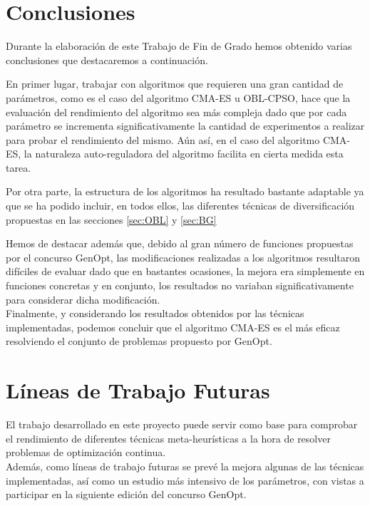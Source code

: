
\section{Conclusiones}

Durante la elaboración de este Trabajo de Fin de Grado hemos obtenido varias conclusiones que destacaremos a continuación.

En primer lugar, trabajar con algoritmos que requieren una gran cantidad de parámetros, como es el caso del algoritmo CMA-ES u OBL-CPSO, hace que la evaluación del rendimiento del algoritmo sea más compleja dado que por cada parámetro se incrementa significativamente la cantidad de experimentos a realizar para probar el rendimiento del mismo. Aún así, en el caso del algoritmo CMA-ES, la naturaleza auto-reguladora del algoritmo facilita en cierta medida esta tarea. 

Por otra parte, la estructura de los algoritmos ha resultado bastante adaptable ya que se ha podido incluir, en todos ellos, las diferentes técnicas de diversificación propuestas en las secciones \ref{sec:OBL} y \ref{sec:BG}

Hemos de destacar además que, debido al gran número de funciones propuestas por el concurso GenOpt, las modificaciones realizadas a los algoritmos resultaron difíciles de evaluar dado que en bastantes ocasiones, la mejora era simplemente en funciones concretas y en conjunto, los resultados no variaban significativamente para considerar dicha modificación.\\

Finalmente, y considerando los resultados obtenidos por las técnicas implementadas, podemos concluir que el algoritmo CMA-ES es el más eficaz resolviendo el conjunto de problemas propuesto por GenOpt.


\section{Líneas de Trabajo Futuras}

El trabajo desarrollado en este proyecto puede servir como base para comprobar el rendimiento de diferentes técnicas meta-heurísticas a la hora de resolver problemas de optimización continua. \\
Además, como líneas de trabajo futuras se prevé la mejora algunas de las técnicas implementadas, así como un estudio más intensivo de los parámetros, con vistas a participar en la siguiente edición del concurso GenOpt.